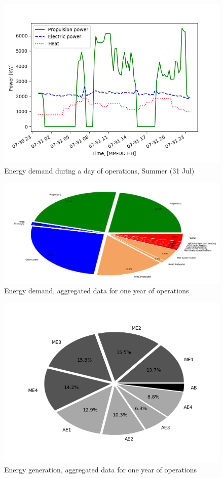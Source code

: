 \documentclass[preprint,12pt]{elsarticle}
\begin{document}
\begin{figure}[htbp]
	\centering
	\includegraphics[width=0.9\linewidth]{Figures/Demand_vs_time_S}
	\caption{Energy demand during a day of operations, Summer (31 Jul)}
	\label{fig:Demand_vs_time_S}
\end{figure}

\begin{figure}[htbp]
	\centering
	\includegraphics[width=0.99\linewidth]{Figures/Pie_EnergyDemand}
	\caption{Energy demand, aggregated data for one year of operations}
	\label{fig:Pie_EnergyDemand}
\end{figure}

\begin{figure}
	\centering
	\includegraphics[width=0.9\linewidth]{Figures/Pie_EnergyGeneration}
	\caption{Energy generation, aggregated data for one year of operations}
	\label{fig:Pie_EnergyGeneration}
\end{figure}
\end{document}
